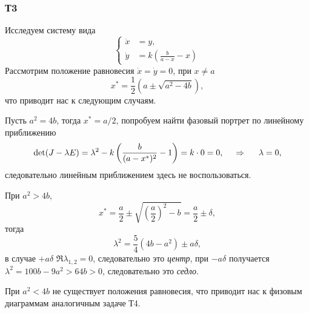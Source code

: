



\subsubsection*{Т3}
Исследуем систему вида
\begin{equation*}
    \left\{\begin{aligned}
        \dot{x} &= y, \\
        \dot{y} &= k \left(
            \frac{b}{a-x} - x
        \right)
    \end{aligned}\right.
\end{equation*}
Рассмотрим положение равновесия $\dot{x} = \dot{y} = 0$, при $x \neq a$
\begin{equation*}
    x^* = \frac{1}{2}\left(
        a \pm \sqrt{a^2 - 4b}
    \right),
\end{equation*}
что приводит нас к следующим случаям. 

Пусть $a^2 = 4b$, тогда $x^* = a/2$, попробуем найти фазовый портрет по линейному приближению
\begin{equation*}
    \det(J - \lambda E) = 
     \lambda^2 - k\left(
        \frac{b}{(a-x^*)^2}-1
     \right) = k \cdot 0 = 0,
     \hspace{0.5cm} \Rightarrow \hspace{0.5cm}
     \lambda = 0,
\end{equation*}
следовательно линейным приближением здесь не воспользоваться.

При $a^2 > 4b$, 
\begin{equation*}
    x^* = \frac{a}{2} \pm \sqrt{
    \left(\frac{a}{2}\right)^2 - b
    } = \frac{a}{2} \pm \delta,
\end{equation*}
тогда
\begin{equation*}
    \lambda^2 = \frac{5}{4} (4b - a^2) \pm a \delta,
\end{equation*}
в случае $+ a\delta$ $\Re \lambda_{1, 2} = 0$, следовательно это \textit{центр}, при $-a \delta$ получается $\lambda^2 = 100 b - 9 a^2 > 64 b > 0$, следовательно это \textit{седло}.

При $a^2 < 4b$ не существует положения равновесия, что приводит нас к физовым диаграммам аналогичным задаче Т4. 






